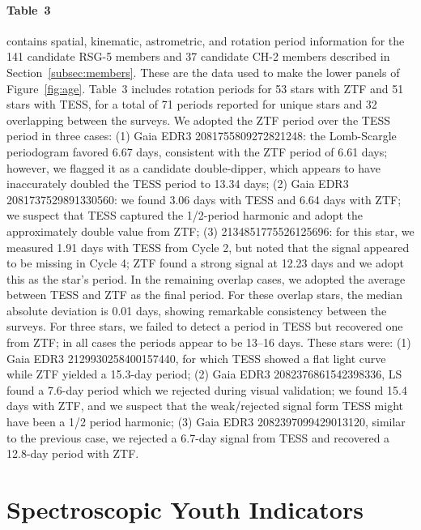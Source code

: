 \documentclass[12pt,twocolumn]{aastex63}
\begin{document}
\paragraph{Table~3} contains spatial, kinematic, astrometric, and rotation period
information for the 141 candidate RSG-5 members and 37 candidate CH-2
members described in Section~\ref{subsec:members}.
These are the data used to make the lower panels of
Figure~\ref{fig:age}.
Table~3 includes rotation periods for 53 stars with ZTF and 51 stars with
 TESS, for a total of 71 periods reported for unique stars and 32
 overlapping between the surveys. We adopted the ZTF period over the
 TESS period in three cases: (1) Gaia EDR3 2081755809272821248: the
 Lomb-Scargle periodogram favored 6.67 days, consistent with the ZTF
 period of 6.61 days; however, we flagged it as a candidate
 double-dipper, which appears to have inaccurately doubled the TESS
 period to 13.34 days; (2) Gaia EDR3 2081737529891330560: we found 3.06
 days with TESS and 6.64 days with ZTF; we suspect that TESS captured
 the 1/2-period harmonic and adopt the approximately double value from
 ZTF; (3) 2134851775526125696: for this star, we measured 1.91 days
 with TESS from Cycle 2, but noted that the signal appeared to be
 missing in Cycle 4; ZTF found a strong signal at 12.23 days and we
 adopt this as the star's period. In the remaining overlap cases, we
 adopted the average between TESS and ZTF as the final period. For
 these overlap stars, the median absolute deviation is 0.01 days,
 showing remarkable consistency between the surveys. For three stars,
 we failed to detect a period in TESS but recovered one from ZTF; in
 all cases the periods appear to be 13--16 days.
 These stars were: (1) Gaia EDR3
 2129930258400157440, for which TESS showed a flat light curve while ZTF yielded
 a 15.3-day period; (2) Gaia EDR3 2082376861542398336, LS found a
 7.6-day period which we rejected during visual validation; we found
 15.4 days with ZTF, and we suspect that the weak/rejected signal form
 TESS might have been a 1/2 period harmonic; (3) Gaia EDR3
 2082397099429013120, similar to the previous case, we rejected a
 6.7-day signal from TESS and recovered a 12.8-day period with ZTF. 


\section{Spectroscopic Youth Indicators}
\label{app:spectra}
\end{document}
